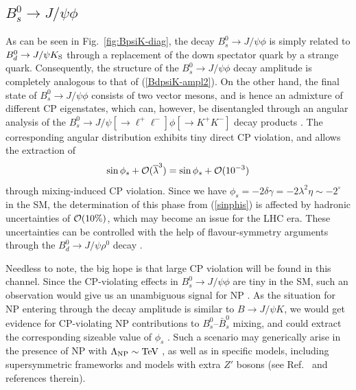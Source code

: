 \documentclass[12pt]{article}
\begin{document}
%
%
%
\boldmath
\subsection{$B^0_s\to J/\psi \phi$}\label{ssec:BsPsiPhi}
\unboldmath
%
%
%
As can be seen in Fig.~\ref{fig:BpsiK-diag}, the decay $B^0_s\to J/\psi \phi$
is simply related to $B^0_d\to J/\psi K_{\rm S}$ through a
replacement of the down spectator quark by a strange quark. Consequently,
the structure of the $B^0_s\to J/\psi\phi$ decay amplitude is  
completely analogous to that of (\ref{BdpsiK-ampl2}). On the other hand, the 
final state of  $B^0_s\to J/\psi\phi$ consists of two vector mesons, and is hence
an admixture of different CP eigenstates, which can, however, be disentangled 
through an angular analysis of the $B^0_s\to J/\psi [\to\ell^+\ell^-]\phi[\to K^+K^-]$
decay products \cite{DDF,DDLR}. The corresponding angular distribution 
exhibits tiny direct CP violation, and allows the extraction of
\begin{equation}\label{sinphis}
\sin\phi_s+{\cal O}(\overline{\lambda}^3)=\sin\phi_s+{\cal O}(10^{-3})
\end{equation}
through mixing-induced CP violation.
Since we have $\phi_s=-2\delta\gamma=-2\lambda^2\eta\sim
-2^\circ$ in the SM, the 
determination of this phase from (\ref{sinphis}) is affected by
hadronic uncertainties of ${\cal O}(10\%)$, which may become an issue 
for the LHC era. These uncertainties can be controlled with
the help of flavour-symmetry arguments through the 
$B^0_d\to J/\psi \rho^0$ decay \cite{RF-ang}.

Needless to note, the big hope is that large CP violation
will be found in this channel. Since the CP-violating effects in 
$B^0_s\to J/\psi\phi$ are tiny in the SM, such an observation 
would give us an unambiguous
signal for NP \cite{DFN,NiSi,Branco}. As the situation for NP entering 
through the decay amplitude is similar to $B\to J/\psi K$, we would get 
evidence for CP-violating NP contributions to $B^0_s$--$\bar B^0_s$ mixing, 
and could extract the corresponding sizeable value of $\phi_s$ \cite{DFN}.
Such a scenario may generically arise in the presence of NP with 
$\Lambda_{\rm NP}\sim\mbox{TeV}$ \cite{RF-Phys-Rep}, as well as 
in specific models, including supersymmetric frameworks and models
with extra $Z'$ bosons (see Ref.~\cite{BF-DMs} and references therein).
\end{document}

